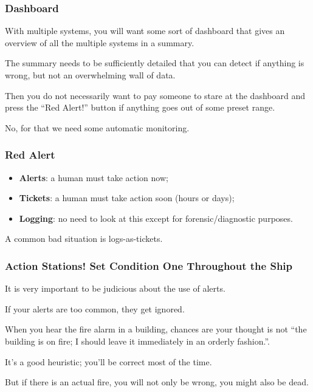 \begin{frame}
\frametitle{Dashboard}

With multiple systems, you will want some sort of dashboard that gives an overview of all the multiple systems in a summary. 

The summary needs to be sufficiently detailed that you can detect if anything is wrong, but not an overwhelming wall of data. 

Then you do not necessarily want to pay someone to stare at the dashboard and press the  ``Red Alert!'' button if anything goes out of some preset range.

No, for that we need some automatic monitoring.


\end{frame}



\begin{frame}
\frametitle{Red Alert}

\begin{itemize}
\item {\bf Alerts}: a human must take action now;
\item {\bf Tickets}: a human must take action soon (hours or days);
\item {\bf Logging}: no need to look at this except for forensic/diagnostic purposes.
\end{itemize}


A common bad situation is logs-as-tickets.

\end{frame}



\begin{frame}
\frametitle{Action Stations! Set Condition One Throughout the Ship}

It is very important to be judicious about the use of alerts. 

If your alerts are too common, they get ignored. 

When you hear the fire alarm in a building, chances are your thought is not ``the building is on fire; I should leave it immediately in an orderly fashion.''.

It's a good heuristic; you'll be correct most of the time. 

But if there is an actual fire, you will not only be wrong, you might also be dead.

\end{frame}



